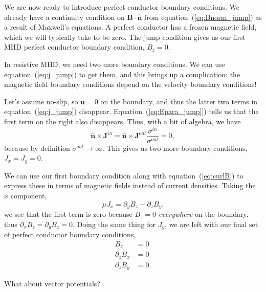 \documentclass[11pt]{article}
\newcommand{\norm}{\hat{\mathbf{n}}}
\begin{document}
We are now ready to introduce perfect conductor boundary conditions.
We already have a continuity condition on $\mathbf{B}\cdot \norm$ from equation~(\ref{eq:Bnorm_jump}) as a result of Maxwell's equations.
A perfect conductor has a frozen magnetic field, which we will typically take to be zero.
The jump condition gives us our first MHD perfect conductor boundary condition, $B_z = 0$.

In resistive MHD, we need two more boundary conditions.
We can use equation~(\ref{eq:j_jump}) to get them, and this brings up a complication: the magnetic field boundary conditions depend on the velocity boundary conditions!

Let's assume no-slip, so $\mathbf{u} = 0$ on the boundary, and thus 
the latter two terms in equation~(\ref{eq:j_jump}) disappear.
Equation~(\ref{eq:Epara_jump]}) tells us that the first term on the right also disappears.
Thus, with a bit of algebra, we have
\begin{equation}
  \label{eq:j_para_perfc}
  \norm \times \mathbf{J}^{in} =  \norm \times \mathbf{J}^{out} \frac{\sigma^{in}}{\sigma^{out}} = 0,
  \end{equation}
because by definition $\sigma^{out} \to \infty$.
This gives us two more boundary conditions, $J_x = J_y = 0$.

We can use our first boundary condition along with equation~(\ref{eq:curlB}) to express these in terms of magnetic fields instead of current densities.
Taking the $x$ component,
\begin{equation}
  \label{eq:jx}
  \mu J_x = \partial_y B_z - \partial_z B_y.
\end{equation}
we see that the first term is zero because $B_z = 0$ \emph{everywhere} on the boundary, thus $\partial_x B_z = \partial_y B_z = 0$.
Doing the same thing for $J_y$, we are left with our final set of perfect conductor boundary conditions,
\begin{align}
  \label{eq:B_bc_perfc}
  B_z &= 0\\
  \partial_z B_x &= 0\\
  \partial_z B_y &= 0.
\end{align}

What about vector potentials?
\end{document}
